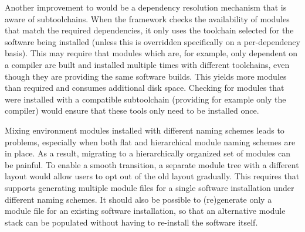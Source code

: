 Another improvement to \easybuild{} would be a dependency resolution
mechanism that is aware of subtoolchains. When the \easybuild{} framework checks the
availability of modules that match the required dependencies, it only uses the toolchain
selected for the software being installed (unless this is overridden specifically on a
per-dependency basis). This may require that modules which are, for example, only
dependent on a compiler are built and installed multiple times with different
toolchains, even though they are providing the same software builds. This yields
more modules than required and consumes additional disk space. Checking for
modules that were installed with a compatible subtoolchain (providing for example
only the compiler) would ensure that these tools only need to be installed once.

Mixing environment modules installed with different naming schemes leads to problems,
especially when both flat and hierarchical module naming schemes are in place.
As a result, migrating to a hierarchically organized set of modules can be painful.
To enable a smooth transition, a separate module tree with a different layout
would allow users to opt out of the old layout gradually.
This requires that \easybuild{} supports generating multiple module files for a
single software installation under different naming schemes. It should also be
possible to (re)generate only a module file for an existing software installation,
so that an alternative module stack can be populated without having to re-install the
software itself.


